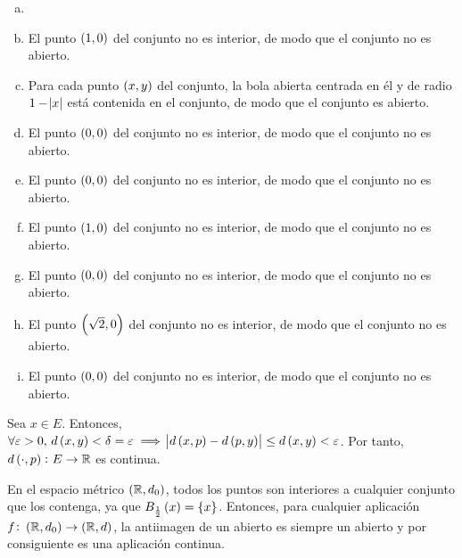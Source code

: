 \begin{eje}
    \begin{enumerate}[(a)]
        \item[]
        \item El punto $\left( 1, 0 \right)$ del conjunto no es interior, de modo que el conjunto no es abierto.
        \item Para cada punto $ \left( x, y \right) $ del conjunto, la bola abierta centrada en él y de radio $1-\abs{x}$ está contenida en el conjunto, de modo que el conjunto es abierto.
        \item El punto $\left( 0, 0 \right)$ del conjunto no es interior, de modo que el conjunto no es abierto.
        \item El punto $\left( 0, 0 \right)$ del conjunto no es interior, de modo que el conjunto no es abierto.
        \item El punto $\left( 1, 0 \right)$ del conjunto no es interior, de modo que el conjunto no es abierto.
        \item El punto $\left( 0, 0 \right)$ del conjunto no es interior, de modo que el conjunto no es abierto.
        \item El punto $\left( \sqrt{2}, 0 \right)$ del conjunto no es interior, de modo que el conjunto no es abierto.
        \item El punto $\left( 0, 0 \right)$ del conjunto no es interior, de modo que el conjunto no es abierto.
    \end{enumerate}
\end{eje}

\begin{eje}
    Sea $x \in E $. Entonces, $\forall \varepsilon>0, \, d \left( x, y \right) < \delta = \varepsilon \implies \abs{d\left( x, p \right) - d \left( p, y \right)} \leq d\left( x, y \right) < \varepsilon$. Por tanto, $d\left( \cdot, p \right) \colon E \to \mathbb{R}$ es continua.
\end{eje}

\begin{eje}
    En el espacio métrico $\left( \mathbb{R}, d_0 \right)$, todos los puntos son interiores a cualquier conjunto que los contenga, ya que $B_{\frac{1}{2}}\left( x \right) = \left\{ x \right\}$. Entonces, para cualquier aplicación $f\colon \left( \mathbb{R}, d_0 \right) \to \left( \mathbb{R}, d \right)$, la antiimagen de un abierto es siempre un abierto y por consiguiente es una aplicación continua.
\end{eje}


